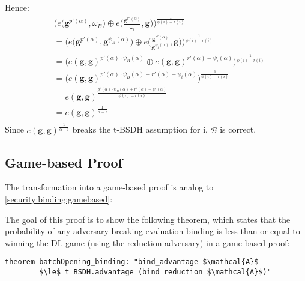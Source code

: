 Hence: 
\begin{equation*}
    \begin{aligned}
        &\biggl(e\biggl(\mathbf{g}^{p'(\alpha)}, \omega_B\biggr) \oplus e\biggl(\frac{\mathbf{g}^{r'(\alpha)}}{\omega_i}, \mathbf{g}\biggr)\biggr)^{\frac{1}{\phi(i)-r(i)}} \\
        &= \biggl(e\biggl(\mathbf{g}^{p'(\alpha)}, \mathbf{g}^{\psi_B(\alpha)}\biggr) \oplus e\biggl(\frac{\mathbf{g}^{r'(\alpha)}}{\mathbf{g}^{\psi_i(\alpha)}}, \mathbf{g}\biggr)\biggr)^{\frac{1}{\phi(i)-r(i)}} \\
        &= \biggl(e(\mathbf{g}, \mathbf{g})^{p'(\alpha) \cdot \psi_B(\alpha)} \oplus e(\mathbf{g}, \mathbf{g})^{r'(\alpha) - \psi_i(\alpha)}\biggr)^{\frac{1}{\phi(i)-r(i)}}\\
        &= \biggl(e(\mathbf{g}, \mathbf{g})^{p'(\alpha) \cdot \psi_B(\alpha) + r'(\alpha) - \psi_i(\alpha)} \biggr)^{\frac{1}{\phi(i)-r(i)}}\\
        &= e(\mathbf{g}, \mathbf{g})^{\frac{p'(\alpha) \cdot \psi_B(\alpha) + r'(\alpha) - \psi_i(\alpha)}{\phi(i)-r(i)}}\\
        &= e(\mathbf{g}, \mathbf{g})^{\frac{1}{\alpha-i}}\\
    \end{aligned}
\end{equation*}
Since $e(\mathbf{g},\mathbf{g})^{\frac{1}{\alpha-i}}$ breaks the t-BSDH assumption for i, $\mathcal{B}$ is correct.

\subsection*{Game-based Proof}
The transformation into a game-based proof is analog to \ref{security:binding:gamebased}: 

The goal of this proof is to show the following theorem, which states that the probability of any adversary breaking evaluation binding is less than or equal to winning the DL game (using the reduction adversary) in a game-based proof:
\begin{lstlisting}[language=isabelle]
    theorem batchOpening_binding: "bind_advantage $\mathcal{A}$ 
        $\le$ t_BSDH.advantage (bind_reduction $\mathcal{A}$)"
\end{lstlisting}

